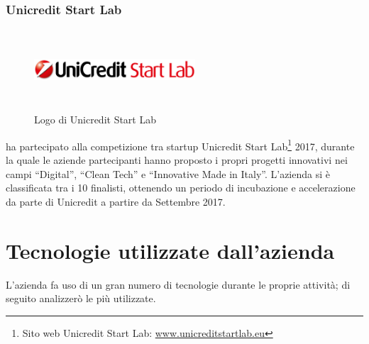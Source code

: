    \subsubsection{Unicredit Start Lab}
   \begin{figure}[H]
      \begin{center}
         \includegraphics[width=6cm,height=3cm,keepaspectratio]{immagini/unicreditstartlab-logo}
      \end{center}
      \caption{Logo di Unicredit Start Lab}\label{logounicreditstartlab}
   \end{figure}
   \nomeAzienda{} ha partecipato alla competizione tra startup Unicredit Start Lab\footnote{Sito web Unicredit Start Lab: \href{http://www.unicreditstartlab.eu}{www.unicreditstartlab.eu}} 2017, durante la quale le aziende partecipanti hanno proposto i propri progetti innovativi nei campi ``Digital'', ``Clean Tech'' e ``Innovative Made in Italy''. L'azienda si è classificata tra i 10 finalisti, ottenendo un periodo di incubazione e accelerazione da parte di Unicredit a partire da Settembre 2017.

\section{Tecnologie utilizzate dall'azienda}
L'azienda fa uso di un gran numero di tecnologie durante le proprie attività; di seguito analizzerò le più utilizzate.

